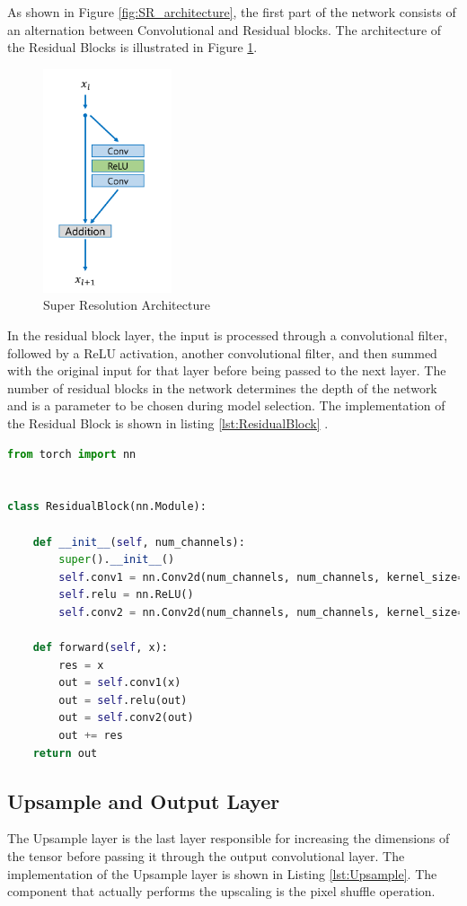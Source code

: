 \documentclass[../report.tex]{subfiles}
\begin{document}
As shown in Figure \ref{fig:SR_architecture}, the first part of the network consists of an alternation between Convolutional and Residual blocks. The architecture of the Residual Blocks is illustrated in Figure \ref{fig:ResidualBlock_architecture}.
\begin{figure}[H]
	\caption{Super Resolution Architecture}
	\centering
	\label{fig:ResidualBlock_architecture}
	\includegraphics[scale=0.5]{../images/ResidualBlock.png}
\end{figure}
In the residual block layer, the input is processed through a convolutional filter, followed by a ReLU activation, another convolutional filter, and then summed with the original input for that layer before being passed to the next layer. The number of residual blocks in the network determines the depth of the network and is a parameter to be chosen during model selection.
The implementation of the Residual Block is shown in listing \ref{lst:ResidualBlock} .

\begin{lstlisting}[style=python,language=python, label={lst:ResidualBlock},caption={Residual Block implementation}]
from torch import nn


class ResidualBlock(nn.Module):

	def __init__(self, num_channels):
		super().__init__()
		self.conv1 = nn.Conv2d(num_channels, num_channels, kernel_size=3, padding=1)
		self.relu = nn.ReLU()
		self.conv2 = nn.Conv2d(num_channels, num_channels, kernel_size=3, padding=1)
	
	def forward(self, x):
		res = x
		out = self.conv1(x)
		out = self.relu(out)
		out = self.conv2(out)
		out += res
	return out
\end{lstlisting}

\subsection{Upsample and Output Layer}
The Upsample layer is the last layer responsible for increasing the dimensions of the tensor before passing it through the output convolutional layer. The implementation of the Upsample layer is shown in Listing \ref{lst:Upsample}. The component that actually performs the upscaling is the pixel shuffle operation.
\end{document}
